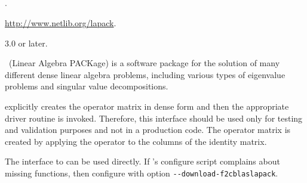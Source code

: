 \subsection*{\underline{\lapack}}
	\begin{description}
	\setlength{\itemsep}{0pt}
	\item[References.]\citep{Anderson:1999:LUG}.
	\item[Website.] \url{http://www.netlib.org/lapack}.
	\item[Version.] 3.0 or later.
	\item[Summary.] \lapack\ (Linear Algebra PACKage) is a software package for the solution of many different dense linear algebra problems, including various types of eigenvalue problems and singular value decompositions.

	\slepc explicitly creates the operator matrix in dense form and then the appropriate \lapack driver routine is invoked. Therefore, this interface should be used only for testing and validation purposes and not in a production code. The operator matrix is created by applying the operator to the columns of the identity matrix.

	\item[Installation.]
	The \slepc interface to \lapack can be used directly. If \slepc's configure script complains about missing \lapack functions, then configure \petsc with option \texttt{-{}-download-f2cblaslapack}.
	\end{description}

